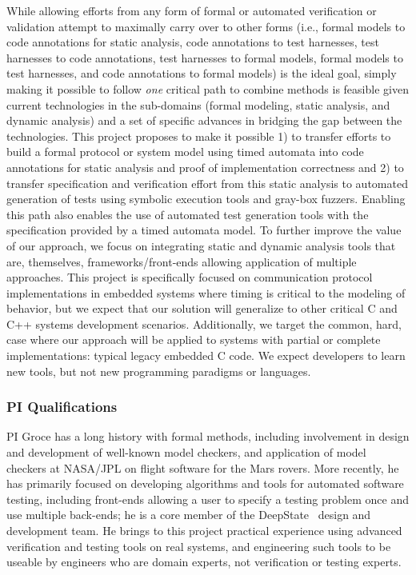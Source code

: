 While allowing efforts from any form of formal or automated verification or validation attempt to maximally carry over to other forms (i.e., formal models to code annotations for static analysis, code annotations to test harnesses, test harnesses to code annotations, test harnesses to formal models, formal models to test harnesses, and code annotations to formal models) is the ideal goal, simply making it possible to follow \emph{one} critical path to combine methods is feasible given current technologies in the sub-domains (formal modeling, static analysis, and dynamic analysis) and a set of specific advances in bridging the gap between the technologies.  This project proposes to make it possible 1) to transfer efforts to build a formal protocol or system model using timed automata into code annotations for static analysis and proof of implementation correctness and 2) to transfer specification and verification effort from this static analysis to automated generation of tests using symbolic execution tools and gray-box fuzzers.  Enabling this path also enables the use of automated test generation tools with the specification provided by a timed automata model.  To further improve the value of our approach, we focus on integrating static and dynamic analysis tools that are, themselves, frameworks/front-ends allowing application of multiple approaches.  This project is specifically focused on communication protocol implementations in embedded systems where timing is critical to the modeling of behavior, but we expect that our solution will generalize to other critical C and C++ systems development scenarios.  Additionally, we target the common, hard, case where our approach will be applied to systems with partial or complete implementations: typical legacy embedded C code.  We expect developers to learn new tools, but not new programming paradigms or languages.

\subsubsection{PI Qualifications}

PI Groce has a long history with formal methods, including involvement in design and development of well-known model checkers, and application of model checkers at NASA/JPL on flight software for the Mars rovers.  More recently, he has primarily focused on developing algorithms and tools for automated software testing, including front-ends allowing a user to specify a testing problem once and use multiple back-ends; he is a core member of the DeepState~\cite{DeepState,deepstatetutorial,deepstaterepo} design and development team.  He brings to this project practical experience using advanced verification and testing tools on real systems, and engineering such tools to be useable by engineers who are domain experts, not verification or testing experts.

